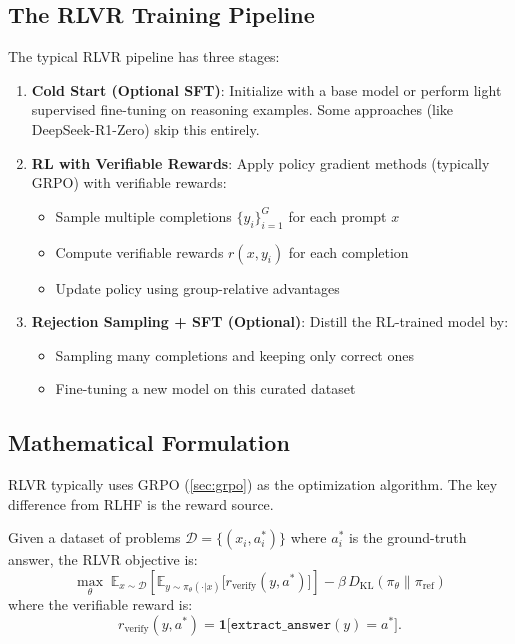 \subsection{The RLVR Training Pipeline}

The typical RLVR pipeline has three stages:

\begin{enumerate}
    \item \textbf{Cold Start (Optional SFT)}: Initialize with a base model or perform light supervised fine-tuning on reasoning examples. Some approaches (like DeepSeek-R1-Zero) skip this entirely.

    \item \textbf{RL with Verifiable Rewards}: Apply policy gradient methods (typically GRPO) with verifiable rewards:
          \begin{itemize}
              \item Sample multiple completions $\{y_i\}_{i=1}^G$ for each prompt $x$
              \item Compute verifiable rewards $r(x, y_i)$ for each completion
              \item Update policy using group-relative advantages
          \end{itemize}

    \item \textbf{Rejection Sampling + SFT (Optional)}: Distill the RL-trained model by:
          \begin{itemize}
              \item Sampling many completions and keeping only correct ones
              \item Fine-tuning a new model on this curated dataset
          \end{itemize}
\end{enumerate}

\subsection{Mathematical Formulation}

RLVR typically uses GRPO (\cref{sec:grpo}) as the optimization algorithm. The key difference from RLHF is the reward source.

\begin{definition}
    Given a dataset of problems $\mathcal{D} = \{(x_i, a_i^*)\}$ where $a_i^*$ is the ground-truth answer, the RLVR objective is:
    \[
        \max_\theta \; \mathbb{E}_{x \sim \mathcal{D}} \left[ \mathbb{E}_{y \sim \pi_\theta(\cdot|x)} \bigl[ r_{\text{verify}}(y, a^*) \bigr] \right] - \beta \, D_{\mathrm{KL}}(\pi_\theta \| \pi_{\text{ref}})
    \]
    where the verifiable reward is:
    \[
        r_{\text{verify}}(y, a^*) = \mathbf{1}\bigl[\texttt{extract\_answer}(y) = a^*\bigr].
    \]
\end{definition}

